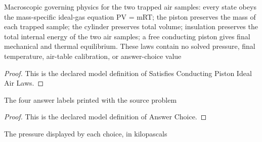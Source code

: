 \begin{definition}
  \label{def:physics:phyx-mini-0458:phyxminiproblems-problemphyxmini0458-satisfiesconductingpistonidealairlaws}
  Macroscopic governing physics for the two trapped air samples: every state obeys the mass-specific ideal-gas equation PV = mRT; the piston preserves the mass of each trapped sample; the cylinder preserves total volume; insulation preserves the total internal energy of the two air samples; a free conducting piston gives final mechanical and thermal equilibrium. These laws contain no solved pressure, final temperature, air-table calibration, or answer-choice value
\end{definition}
\begin{proof}
  This is the declared model definition of Satisfies Conducting Piston Ideal Air Laws.
\end{proof}
\begin{definition}
  \label{def:physics:phyx-mini-0458:phyxminiproblems-problemphyxmini0458-answerchoice}
  The four answer labels printed with the source problem
\end{definition}
\begin{proof}
  This is the declared model definition of Answer Choice.
\end{proof}
\begin{definition}
  \label{def:physics:phyx-mini-0458:phyxminiproblems-problemphyxmini0458-displayedpressureinkilopascals}
  The pressure displayed by each choice, in kilopascals
\end{definition}
